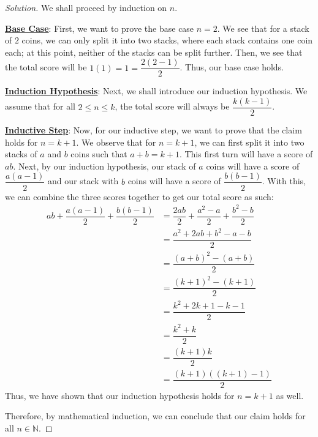 \documentclass{article}
\newenvironment{solution}{\begin{proof}[Solution]}{\end{proof}}
\newcommand{\NN}{\mathbb{N}}
\begin{document}
\begin{solution}
	We shall proceed by induction on $n$.
	
	\underline{\textbf{Base Case}}: First, we want to prove the base case $n=2$. We see that for a stack of $2$ coins, we can only split it into two stacks, where each stack contains one coin each; at this point, neither of the stacks can be split further. Then, we see that the total score will be $1(1)=1=\dfrac{2(2-1)}{2}$. Thus, our base case holds.
	
	\underline{\textbf{Induction Hypothesis}}: Next, we shall introduce our induction hypothesis. We assume that for all $2 \leq n \leq k$, the total score will always be $\dfrac{k\left( k-1 \right)}{2}$.
	
	\underline{\textbf{Inductive Step}}: Now, for our inductive step, we want to prove that the claim holds for $n=k+1$. We observe that for $n=k+1$, we can first split it into two stacks of $a$ and $b$ coins such that $a+b=k+1$. This first turn will have a score of $ab$. Next, by our induction hypothesis, our stack of $a$ coins will have a score of $\dfrac{a\left( a-1 \right)}{2}$ and our stack with $b$ coins will have a score of $\dfrac{b\left( b-1 \right)}{2}$. With this, we can combine the three scores together to get our total score as such:
	\begin{align*}
		ab + \dfrac{a\left( a-1 \right)}{2} + \dfrac{b\left( b-1 \right)}{2} &= \dfrac{2ab}{2} + \dfrac{a^{2} - a}{2} + \dfrac{b^{2}-b}{2} \\
		&= \dfrac{a^{2} + 2ab + b^{2} - a - b}{2} \\
		&= \dfrac{\left( a+b \right)^{2} - \left( a + b \right)}{2} \\
		&= \dfrac{\left( k+1 \right)^{2} - \left( k + 1 \right)}{2} \\
		&= \dfrac{k^{2} + 2k + 1 - k - 1}{2} \\
		&= \dfrac{k^{2}+k}{2} \\
		&= \dfrac{\left( k+1 \right)k}{2} \\
		&= \dfrac{\left( k+1 \right)\left( \left( k+1 \right)-1 \right)}{2}
	\end{align*}
	Thus, we have shown that our induction hypothesis holds for $n=k+1$ as well. 
	
	Therefore, by mathematical induction, we can conclude that our claim holds for all $n \in \NN$.
\end{solution}
\end{document}
